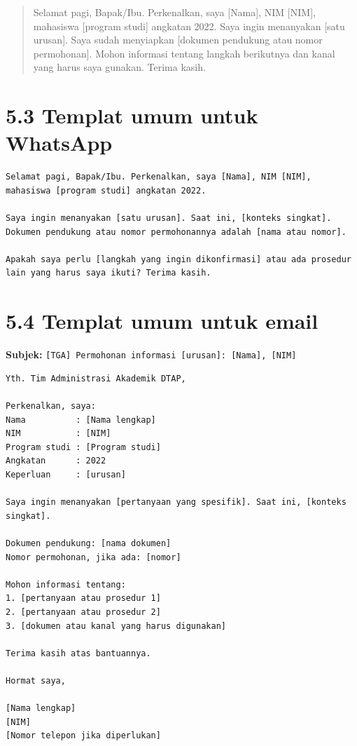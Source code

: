 \documentclass[
  indonesian,
]{article}
\renewcommand{\subsection}{\section}
\begin{document}
\begin{quote}
Selamat pagi, Bapak/Ibu. Perkenalkan, saya {[}Nama{]}, NIM {[}NIM{]},
mahasiswa {[}program studi{]} angkatan 2022. Saya ingin menanyakan
{[}satu urusan{]}. Saya sudah menyiapkan {[}dokumen pendukung atau nomor
permohonan{]}. Mohon informasi tentang langkah berikutnya dan kanal yang
harus saya gunakan. Terima kasih.
\end{quote}

\subsection{5.3 Templat umum untuk
WhatsApp}\label{templat-umum-untuk-whatsapp}

\begin{verbatim}
Selamat pagi, Bapak/Ibu. Perkenalkan, saya [Nama], NIM [NIM], mahasiswa [program studi] angkatan 2022.

Saya ingin menanyakan [satu urusan]. Saat ini, [konteks singkat]. Dokumen pendukung atau nomor permohonannya adalah [nama atau nomor].

Apakah saya perlu [langkah yang ingin dikonfirmasi] atau ada prosedur lain yang harus saya ikuti? Terima kasih.
\end{verbatim}

\subsection{5.4 Templat umum untuk
email}\label{templat-umum-untuk-email}

\textbf{Subjek:}
\texttt{{[}TGA{]}\ Permohonan\ informasi\ {[}urusan{]}:\ {[}Nama{]},\ {[}NIM{]}}

\begin{verbatim}
Yth. Tim Administrasi Akademik DTAP,

Perkenalkan, saya:
Nama          : [Nama lengkap]
NIM           : [NIM]
Program studi : [Program studi]
Angkatan      : 2022
Keperluan     : [urusan]

Saya ingin menanyakan [pertanyaan yang spesifik]. Saat ini, [konteks singkat].

Dokumen pendukung: [nama dokumen]
Nomor permohonan, jika ada: [nomor]

Mohon informasi tentang:
1. [pertanyaan atau prosedur 1]
2. [pertanyaan atau prosedur 2]
3. [dokumen atau kanal yang harus digunakan]

Terima kasih atas bantuannya.

Hormat saya,

[Nama lengkap]
[NIM]
[Nomor telepon jika diperlukan]
\end{verbatim}
\end{document}
